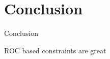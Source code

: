 \section{Conclusion}
\begin{frame}{Conclusion}

    ROC based constraints are great
    
\end{frame}